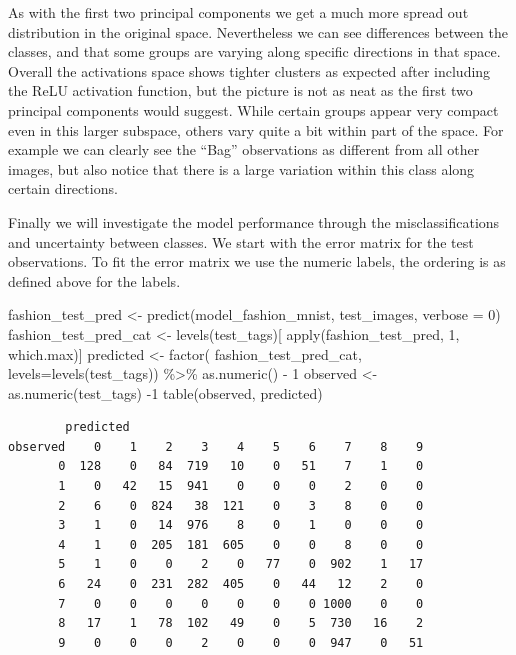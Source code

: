 \documentclass[
  letterpaper,
]{krantz}
\newenvironment{Shaded}{\begin{snugshade}}{\end{snugshade}}
\newcommand{\AttributeTok}[1]{\textcolor[rgb]{0.40,0.45,0.13}{#1}}
\newcommand{\DecValTok}[1]{\textcolor[rgb]{0.68,0.00,0.00}{#1}}
\newcommand{\FunctionTok}[1]{\textcolor[rgb]{0.28,0.35,0.67}{#1}}
\newcommand{\NormalTok}[1]{\textcolor[rgb]{0.00,0.23,0.31}{#1}}
\newcommand{\OtherTok}[1]{\textcolor[rgb]{0.00,0.23,0.31}{#1}}
\newcommand{\SpecialCharTok}[1]{\textcolor[rgb]{0.37,0.37,0.37}{#1}}
\begin{document}
As with the first two principal components we get a much more spread out
distribution in the original space. Nevertheless we can see differences
between the classes, and that some groups are varying along specific
directions in that space. Overall the activations space shows tighter
clusters as expected after including the ReLU activation function, but
the picture is not as neat as the first two principal components would
suggest. While certain groups appear very compact even in this larger
subspace, others vary quite a bit within part of the space. For example
we can clearly see the ``Bag'' observations as different from all other
images, but also notice that there is a large variation within this
class along certain directions.

Finally we will investigate the model performance through the
misclassifications and uncertainty between classes. We start with the
error matrix for the test observations. To fit the error matrix we use
the numeric labels, the ordering is as defined above for the labels.

\begin{Shaded}
\begin{Highlighting}[]
\NormalTok{fashion\_test\_pred }\OtherTok{\textless{}{-}} \FunctionTok{predict}\NormalTok{(model\_fashion\_mnist,}
\NormalTok{                             test\_images, }\AttributeTok{verbose =} \DecValTok{0}\NormalTok{)}
\NormalTok{fashion\_test\_pred\_cat }\OtherTok{\textless{}{-}} \FunctionTok{levels}\NormalTok{(test\_tags)[}
  \FunctionTok{apply}\NormalTok{(fashion\_test\_pred, }\DecValTok{1}\NormalTok{,}
\NormalTok{        which.max)]}
\NormalTok{predicted }\OtherTok{\textless{}{-}} \FunctionTok{factor}\NormalTok{(}
\NormalTok{  fashion\_test\_pred\_cat,}
  \AttributeTok{levels=}\FunctionTok{levels}\NormalTok{(test\_tags)) }\SpecialCharTok{\%\textgreater{}\%}
  \FunctionTok{as.numeric}\NormalTok{() }\SpecialCharTok{{-}} \DecValTok{1}
\NormalTok{observed }\OtherTok{\textless{}{-}} \FunctionTok{as.numeric}\NormalTok{(test\_tags) }\SpecialCharTok{{-}}\DecValTok{1}
\FunctionTok{table}\NormalTok{(observed, predicted)}
\end{Highlighting}
\end{Shaded}

\begin{verbatim}
        predicted
observed    0    1    2    3    4    5    6    7    8    9
       0  128    0   84  719   10    0   51    7    1    0
       1    0   42   15  941    0    0    0    2    0    0
       2    6    0  824   38  121    0    3    8    0    0
       3    1    0   14  976    8    0    1    0    0    0
       4    1    0  205  181  605    0    0    8    0    0
       5    1    0    0    2    0   77    0  902    1   17
       6   24    0  231  282  405    0   44   12    2    0
       7    0    0    0    0    0    0    0 1000    0    0
       8   17    1   78  102   49    0    5  730   16    2
       9    0    0    0    2    0    0    0  947    0   51
\end{verbatim}
\end{document}
